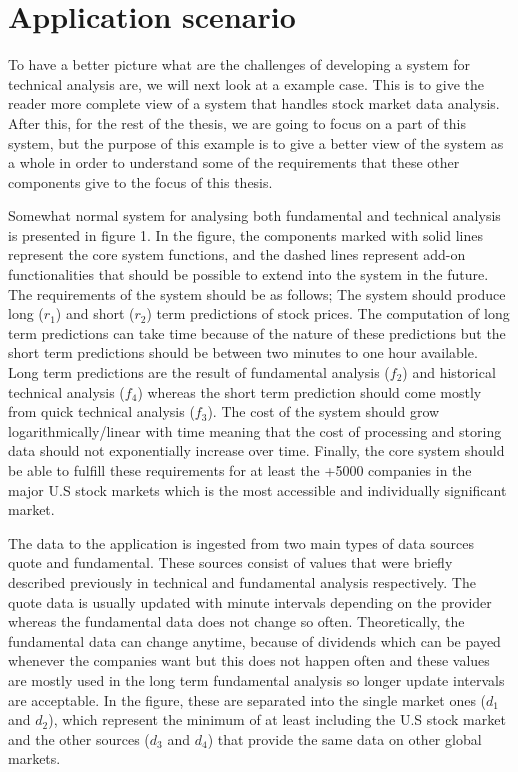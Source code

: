 \section{Application scenario}

To have a better picture what are the challenges of developing a system for technical analysis are, we will next look at a example case.
This is to give the reader more complete view of a system that handles stock market data analysis.
After this, for the rest of the thesis, we are going to focus on a part of this system, but the purpose of this example is to give a better view of the system as a whole in order to understand some of the requirements that these other components give to the focus of this thesis.

Somewhat normal system for analysing both fundamental and technical analysis is presented in figure 1.
In the figure, the components marked with solid lines represent the core system functions, and the dashed lines represent add-on functionalities that should be possible to extend into the system in the future.
The requirements of the system should be as follows;
The system should produce long ($r_1$) and short ($r_2$) term predictions of stock prices.
The computation of long term predictions can take time because of the nature of these predictions but the short term predictions should be between two minutes to one hour available.
Long term predictions are the result of fundamental analysis ($f_2$) and historical technical analysis ($f_4$) whereas the short term prediction should come mostly from quick technical analysis ($f_3$).
The cost of the system should grow logarithmically/linear with time meaning that the cost of processing and storing data should not exponentially increase over time.
Finally, the core system should be able to fulfill these requirements for at least the +5000 companies in the major U.S stock markets which is the most accessible and individually significant market.

The data to the application is ingested from two main types of data sources quote and fundamental.
These sources consist of values that were briefly described previously in technical and fundamental analysis respectively.
The quote data is usually updated with minute intervals depending on the provider whereas the fundamental data does not change so often.
Theoretically, the fundamental data can change anytime, because of dividends which can be payed whenever the companies want but this does not happen often and these values are mostly used in the long term fundamental analysis so longer update intervals are acceptable.
In the figure, these are separated into the single market ones ($d_1$ and $d_2$), which represent the minimum of at least including the U.S stock market and the other sources ($d_3$ and $d_4$) that provide the same data on other global markets.

